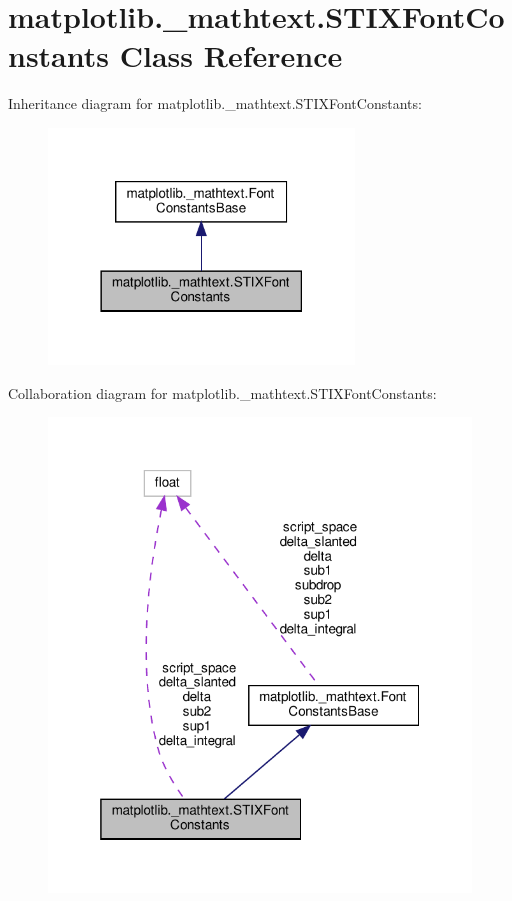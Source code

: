 \hypertarget{classmatplotlib_1_1__mathtext_1_1STIXFontConstants}{}\section{matplotlib.\+\_\+mathtext.\+S\+T\+I\+X\+Font\+Constants Class Reference}
\label{classmatplotlib_1_1__mathtext_1_1STIXFontConstants}


Inheritance diagram for matplotlib.\+\_\+mathtext.\+S\+T\+I\+X\+Font\+Constants\+:
\nopagebreak
\begin{figure}[H]
\begin{center}
\leavevmode
\includegraphics[width=230pt]{classmatplotlib_1_1__mathtext_1_1STIXFontConstants__inherit__graph}
\end{center}
\end{figure}


Collaboration diagram for matplotlib.\+\_\+mathtext.\+S\+T\+I\+X\+Font\+Constants\+:
\nopagebreak
\begin{figure}[H]
\begin{center}
\leavevmode
\includegraphics[width=319pt]{classmatplotlib_1_1__mathtext_1_1STIXFontConstants__coll__graph}
\end{center}
\end{figure}
